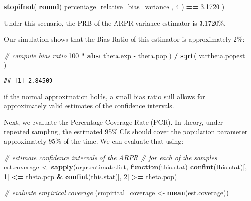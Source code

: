 \documentclass[
]{book}
\newenvironment{Shaded}{\begin{snugshade}}{\end{snugshade}}
\newcommand{\CommentTok}[1]{\textcolor[rgb]{0.56,0.35,0.01}{\textit{#1}}}
\newcommand{\ControlFlowTok}[1]{\textcolor[rgb]{0.13,0.29,0.53}{\textbf{#1}}}
\newcommand{\DecValTok}[1]{\textcolor[rgb]{0.00,0.00,0.81}{#1}}
\newcommand{\FloatTok}[1]{\textcolor[rgb]{0.00,0.00,0.81}{#1}}
\newcommand{\FunctionTok}[1]{\textcolor[rgb]{0.13,0.29,0.53}{\textbf{#1}}}
\newcommand{\NormalTok}[1]{#1}
\newcommand{\OtherTok}[1]{\textcolor[rgb]{0.56,0.35,0.01}{#1}}
\newcommand{\SpecialCharTok}[1]{\textcolor[rgb]{0.81,0.36,0.00}{\textbf{#1}}}
\begin{document}
\begin{Shaded}
\begin{Highlighting}[]
\FunctionTok{stopifnot}\NormalTok{( }\FunctionTok{round}\NormalTok{( percentage\_relative\_bias\_variance , }\DecValTok{4}\NormalTok{ ) }\SpecialCharTok{==} \FloatTok{3.1720}\NormalTok{ ) }
\end{Highlighting}
\end{Shaded}

Under this scenario, the PRB of the ARPR variance estimator is 3.1720\%.

Our simulation shows that the Bias Ratio of this estimator is approximately 2\%:

\begin{Shaded}
\begin{Highlighting}[]
\CommentTok{\# compute bias ratio}
\DecValTok{100} \SpecialCharTok{*} \FunctionTok{abs}\NormalTok{( theta.exp }\SpecialCharTok{{-}}\NormalTok{ theta.pop ) }\SpecialCharTok{/} \FunctionTok{sqrt}\NormalTok{( vartheta.popest )}
\end{Highlighting}
\end{Shaded}

\begin{verbatim}
## [1] 2.84509
\end{verbatim}

\noindent if the normal approximation holds, a small bias ratio still allows for approximately valid estimates of the confidence intervals.

Next, we evaluate the Percentage Coverage Rate (PCR). In theory, under repeated sampling, the estimated 95\% CIs should cover the population parameter approximately 95\% of the time. We can evaluate that using:

\begin{Shaded}
\begin{Highlighting}[]
\CommentTok{\# estimate confidence intervals of the ARPR}
\CommentTok{\# for each of the samples}
\NormalTok{est.coverage }\OtherTok{\textless{}{-}}
  \FunctionTok{sapply}\NormalTok{(arpr.estimate.list, }\ControlFlowTok{function}\NormalTok{(this.stat)}
    \FunctionTok{confint}\NormalTok{(this.stat)[, }\DecValTok{1}\NormalTok{] }\SpecialCharTok{\textless{}=}\NormalTok{ theta.pop }\SpecialCharTok{\&}
      \FunctionTok{confint}\NormalTok{(this.stat)[, }\DecValTok{2}\NormalTok{] }\SpecialCharTok{\textgreater{}=}\NormalTok{ theta.pop)}

\CommentTok{\# evaluate empirical coverage}
\NormalTok{(empirical\_coverage }\OtherTok{\textless{}{-}} \FunctionTok{mean}\NormalTok{(est.coverage))}
\end{Highlighting}
\end{Shaded}
\end{document}
